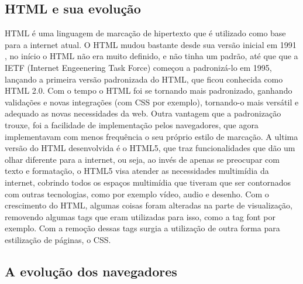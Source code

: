 \subsection{HTML e sua evolução}

HTML é uma linguagem de marcação de hipertexto que é utilizado como base para a internet
atual. O HTML mudou bastante desde sua versão inicial em 1991
\cite{powell2003html}, no início o HTML não era muito definido, e não tinha um padrão, até que que a
IETF (Internet Engeenering Task Force) começou a padronizá-lo em 1995, lançando a
primeira versão padronizada do HTML, que ficou conhecida como HTML 2.0.
Com o tempo o HTML foi se tornando mais padronizado, ganhando validações e novas integrações
(com CSS por exemplo), tornando-o mais versátil e adequado as novas necessidades da
web. Outra vantagem que a padronização trouxe, foi a facilidade de implementação pelos
navegadores, que agora implementavam com menos frequência o seu próprio estilo de marcação.
A ultima versão do HTML desenvolvida é o HTML5, que traz funcionalidades que dão um
olhar diferente para a internet, ou seja, ao invés de apenas se preocupar com texto
e formatação, o HTML5 visa atender as necessidades multimídia da internet, cobrindo
todos os espaços multimídia que tiveram que ser contornados com outras tecnologias,
como por exemplo vídeo, audio e desenho.
Com o crescimento do HTML, algumas coisas foram alteradas na parte de visualização,
removendo algumas tags que eram utilizadas para isso, como a tag font por exemplo.
Com a remoção dessas tags surgia a utilização de outra forma para
estilização de páginas, o CSS.

\subsection{A evolução dos navegadores}

